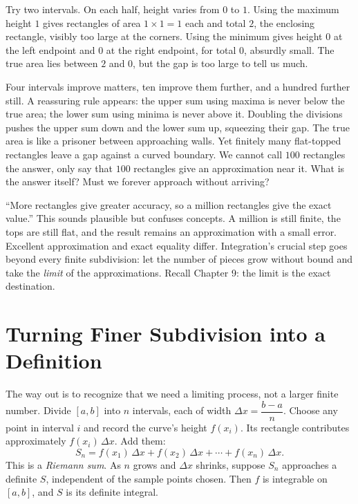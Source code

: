 Try two intervals. On each half, height varies from $0$ to $1$. Using the maximum height $1$ gives rectangles of area $1\times 1=1$ each and total $2$, the enclosing rectangle, visibly too large at the corners. Using the minimum gives height $0$ at the left endpoint and $0$ at the right endpoint, for total $0$, absurdly small. The true area lies between $2$ and $0$, but the gap is too large to tell us much.

Four intervals improve matters, ten improve them further, and a hundred further still. A reassuring rule appears: the upper sum using maxima is never below the true area; the lower sum using minima is never above it. Doubling the divisions pushes the upper sum down and the lower sum up, squeezing their gap. The true area is like a prisoner between approaching walls. Yet finitely many flat-topped rectangles leave a gap against a curved boundary. We cannot call $100$ rectangles the answer, only say that $100$ rectangles give an approximation near it. What is the answer itself? Must we forever approach without arriving?

\begin{fanli}
``More rectangles give greater accuracy, so a million rectangles give the exact value.'' This sounds plausible but confuses concepts. A million is still finite, the tops are still flat, and the result remains an approximation with a small error. Excellent approximation and exact equality differ. Integration's crucial step goes beyond every finite subdivision: let the number of pieces grow without bound and take the \emph{limit} of the approximations. Recall Chapter 9: the limit is the exact destination.
\end{fanli}

\section{Turning Finer Subdivision into a Definition}

The way out is to recognize that we need a limiting process, not a larger finite number. Divide $[a,b]$ into $n$ intervals, each of width $\Delta x=\dfrac{b-a}{n}$. Choose any point in interval $i$ and record the curve's height $f(x_i)$. Its rectangle contributes approximately $f(x_i)\,\Delta x$. Add them:
\[
S_n=f(x_1)\,\Delta x+f(x_2)\,\Delta x+\cdots+f(x_n)\,\Delta x .
\]
This is a \emph{Riemann sum}. As $n$ grows and $\Delta x$ shrinks, suppose $S_n$ approaches a definite $S$, independent of the sample points chosen. Then $f$ is integrable on $[a,b]$, and $S$ is its definite integral.


